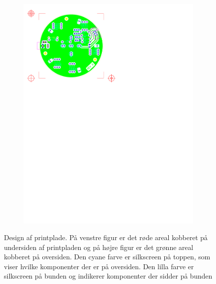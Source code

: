 \documentclass[Rapport/Rapport_main.tex]{subfiles}
\begin{document}
\begin{figure}[H]
{\begin{subfigure}{.55\textwidth}
  \centering
    \includegraphics[width=1\linewidth,trim={0.6in 7.28in 4.5in 0.5in},clip, page=1]{HardwareDesign/CupHolder/graphics/top.pdf}
\end{subfigure}
}
\caption{Design af printplade. På venstre figur er det røde areal kobberet på undersiden af printpladen og på højre figur er det grønne areal kobberet på oversiden. Den cyane farve er silkscreen på toppen, som viser hvilke komponenter der er på oversiden. Den lilla farve er silkscreen på bunden og indikerer komponenter der sidder på bunden}
\label{fig:CupHolderPrintpladeDesign}
\end{figure}
\end{document}
